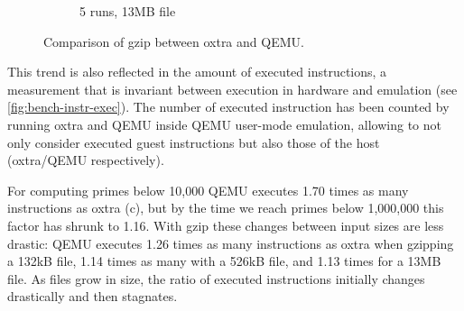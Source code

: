 \begin{figure}[H]
\begin{subfigure}[b]{1.0\textwidth}
		\caption{5 runs, 13MB file}
		\label{fig:bench-gzip-13mb}
	\end{subfigure}
	\caption[Gzip Benchmarking]{Comparison of gzip between oxtra and QEMU.}
	\label{fig:bench-gzip}
\end{figure}

This trend is also reflected in the amount of executed instructions, a measurement that is invariant between execution in hardware and emulation (see \autoref{fig:bench-instr-exec}). The number of executed instruction has been counted by running oxtra and QEMU inside QEMU user-mode emulation, allowing to not only consider executed guest instructions but also those of the host (oxtra/QEMU respectively).

For computing primes below 10,000 QEMU executes 1.70 times as many instructions as oxtra (c), but by the time we reach primes below 1,000,000 this factor has shrunk to 1.16. With gzip these changes between input sizes are less drastic: QEMU executes 1.26 times as many instructions as oxtra when gzipping a 132kB file, 1.14 times as many with a 526kB file, and 1.13 times for a 13MB file. As files grow in size, the ratio of executed instructions initially changes drastically and then stagnates.

